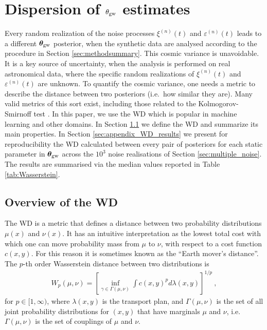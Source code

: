 \documentclass[fleqn,usenatbib,useAMS]{mnras}
\begin{document}
\section{Dispersion of ${\theta}_{\rm gw}$ estimates}\label{sec:wasserstein}
Every random realization of the noise processes $\xi^{(n)}(t)$ and $\varepsilon^{(n)}(t)$ leads to a different ${\boldsymbol{\theta}}_{\rm gw}$ posterior, when the synthetic data are analysed according to the procedure in Section \ref{sec:methodsummary}. This cosmic variance is unavoidable. It is a key source of uncertainty, when the analysis is performed on real astronomical data, where the specific random realizations of $\xi^{(n)}(t)$ and $\varepsilon^{(n)}(t)$ are unknown. To quantify the cosmic variance, one needs a metric to describe the distance between two posteriors (i.e.\ how similar they are). Many valid metrics of this sort exist, including those related to the Kolmogorov-Smirnoff test \citep{corder2014nonparametric}. In this paper, we use the WD \citep{Wasserstein,Villani2009} which is popular in machine learning \citep[e.g.][]{2017arXiv170107875A} and other domains. In Section \ref{sec:appendix_overview_WD} we define the WD and summarize its main properties. In Section \ref{sec:appendix_WD_results} we present for reproducibility the WD calculated between every pair of posteriors for each static parameter in $\boldsymbol{\theta}_{\rm gw}$ across the $10^3$ noise realisations of Section  \ref{sec:multiple_noise}. The results are summarised via the median values reported in Table \ref{tab:Wasserstein}.



\subsection{Overview of the WD}\label{sec:appendix_overview_WD}
The WD is a metric that defines a distance between two probability distributions $\mu(x)$ and $\nu(x)$. It has an intuitive interpretation as the lowest total cost with which one can move probability mass from $\mu$ to $\nu$, with respect to a cost function $c(x,y)$. For this reason it is sometimes known as the ``Earth mover's distance''. The $p$-th order Wasserstein distance between two distributions is
\begin{eqnarray}
	W_p(\mu,\nu)= \left[ \inf_{\gamma \in \Gamma(\mu, \nu)}  \int c(x,y)^p d \lambda (x,y)\right]^{1/p} \label{eq:wasserstein} \ ,
\end{eqnarray}
for $p \in [1,\infty)$, where $\lambda(x,y)$ is the transport plan, and $\Gamma(\mu, \nu)$ is the set of all joint probability distributions for $(x,y)$ that have marginals $\mu$ and $\nu$, i.e. $\Gamma(\mu, \nu)$ is the set of couplings of $\mu$ and $\nu$. \newline 
\end{document}
